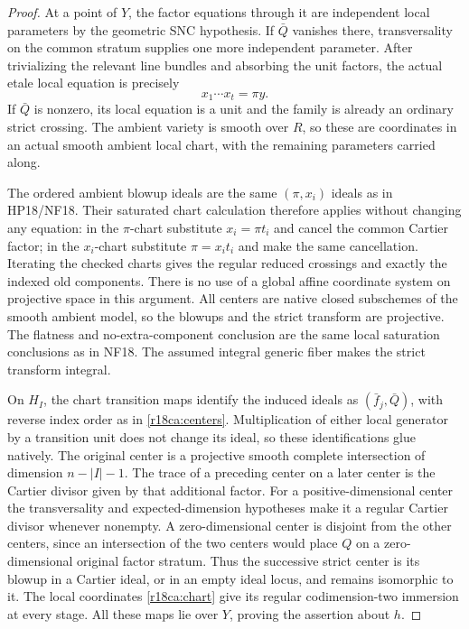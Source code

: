 \begin{proof}
At a point of $Y$, the factor equations through it are
independent local parameters by the geometric SNC hypothesis.
If $\bar Q$ vanishes there, transversality on the common
stratum supplies one more independent parameter.  After
trivializing the relevant line bundles and absorbing the
unit factors, the actual etale local equation is precisely
\[
                         x_1\cdots x_t=\pi y.
 \tag{CA18.4}\label{r18ca:chart}
\]
If $\bar Q$ is nonzero, its local equation is a unit and
the family is already an ordinary strict crossing.
The ambient variety is smooth over $R$, so these are
coordinates in an actual smooth ambient local chart,
with the remaining parameters carried along.

The ordered ambient blowup ideals are the same $(\pi,x_i)$
ideals as in HP18/NF18.  Their saturated chart calculation
therefore applies without changing any equation: in the
$\pi$-chart substitute $x_i=\pi t_i$ and cancel the common
Cartier factor; in the $x_i$-chart substitute $\pi=x_i t_i$
and make the same cancellation.  Iterating the checked charts
gives the regular reduced crossings and exactly the indexed
old components.  There is no use of a global affine coordinate
system on projective space in this argument.
All centers are native closed subschemes of the smooth
ambient model, so the blowups and the strict transform are
projective.  The flatness and no-extra-component conclusion
are the same local saturation conclusions as in NF18.
The assumed integral generic fiber makes the strict transform
integral.

On $H_I$, the chart transition maps identify the induced
ideals as $(\bar f_j,\bar Q)$, with reverse index order
as in \eqref{r18ca:centers}.  Multiplication of either
local generator by a transition unit does not change
its ideal, so these identifications glue natively.
The original center is a projective smooth complete
intersection of dimension $n-|I|-1$.
The trace of a preceding center on a later center is
the Cartier divisor given by that additional factor.
For a positive-dimensional center the transversality
and expected-dimension hypotheses make it a regular
Cartier divisor whenever nonempty.  A zero-dimensional
center is disjoint from the other centers, since an
intersection of the two centers would place $Q$ on a
zero-dimensional original factor stratum.  Thus the
successive strict center is its blowup in a Cartier
ideal, or in an empty ideal locus, and remains isomorphic
to it.  The local coordinates \eqref{r18ca:chart} give its
regular codimension-two immersion at every stage.
All these maps lie over $Y$, proving the assertion about $h$.
\end{proof}


